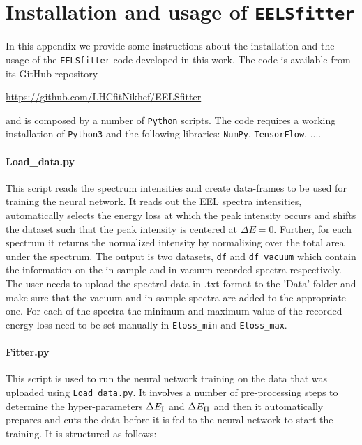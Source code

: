 
\section{Installation and usage of {\tt EELSfitter}}
\label{sec:installation}

In this appendix we provide some instructions about the installation
and the usage of the {\tt EELSfitter} code developed
in this work.
%
The code is available from its GitHub repository
\begin{center}
\url{https://github.com/LHCfitNikhef/EELSfitter}
\end{center}
and is composed by a number of {\tt Python} scripts.
%
The code requires a working installation of {\tt Python3} and the following
libraries: {\tt NumPy}, {\tt TensorFlow}, ....

\noindent
\paragraph{Load\_data.py}
%
This script reads the spectrum
intensities and create data-frames to be used for training the neural network.
%
It reads out the EEL spectra intensities, automatically selects the energy loss
at which the peak intensity occurs and shifts the dataset such that
the peak intensity is centered at $\Delta E =$0. 
%
Further, for each spectrum it returns the normalized intensity by normalizing
over the total area under the spectrum. 
%
The output is two datasets, {\tt df} and {\tt df\_vacuum} which contain the 
information on the in-sample and in-vacuum recorded spectra respectively. 
%
The user needs to upload the spectral data in .txt format to the 'Data' folder
and make sure that the vacuum and in-sample spectra are added to the appropriate one.
%
For each of the spectra the minimum and maximum value of the recorded energy 
loss need to be set manually in {\tt Eloss\_min} and {\tt Eloss\_max}.

\noindent
\paragraph{Fitter.py}
%
This script is used to run the neural network training on the data that was 
uploaded using {\tt Load\_data.py}.
%
It involves a number of pre-processing steps to determine the hyper-parameters $\Delta E_{\rm I}$
and $\Delta E_{\rm II}$ and then
it automatically prepares and cuts the data before it is fed
to the neural network to start the training.
%
It is structured as follows:

